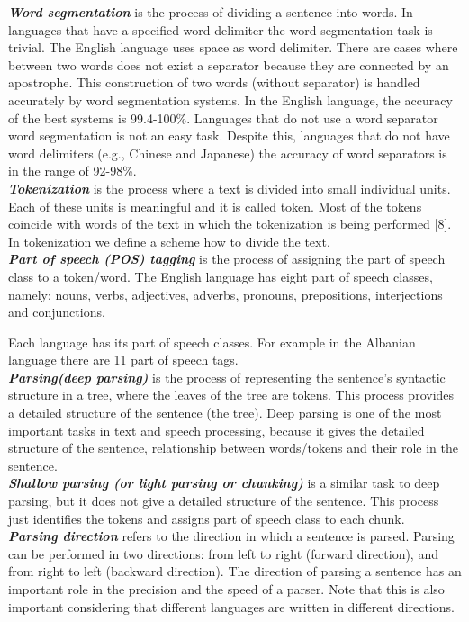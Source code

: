 \emph{ \textbf{ Word segmentation}} is the process of dividing a sentence into words. In languages that have a specified word delimiter the word segmentation task is trivial. The English language uses space as word delimiter. There are cases where between  two words does not exist a separator because they are connected by an apostrophe. This construction of two words (without separator) is handled accurately by word segmentation systems. In the English language, the accuracy of the best systems is 99.4-100\%. Languages that do not use a word separator word segmentation is not an easy task. Despite this, languages that do not have word delimiters (e.g., Chinese and Japanese) the accuracy of word separators is in the range of 92-98\%.\\

\emph{ \textbf{Tokenization}} is the process where a text is divided into small individual units. Each of these units is meaningful and it is called token. Most of the tokens coincide with words of the text in which the tokenization is being performed [8]. In tokenization we define a scheme how to divide the text.\\

\emph{ \textbf{Part of speech (POS) tagging}} is the process of assigning the part of speech class to a token/word. The English language has eight part of speech classes, namely: nouns, verbs, adjectives, adverbs, pronouns, prepositions, interjections and conjunctions.

Each language has its part of speech classes. For example in the Albanian language there are 11 part of speech tags.\\

\emph{ \textbf{Parsing(deep parsing)}} is the process of representing the sentence's syntactic structure in a tree, where the leaves of the tree are tokens. This process provides a detailed structure of the sentence (the tree). Deep parsing is one of the most important tasks in text and speech processing, because it gives the detailed structure of the sentence, relationship between words/tokens and their role in the sentence.\\

\emph{ \textbf{Shallow parsing (or light parsing or chunking)}} is a similar task to deep parsing, but it does not give a detailed structure of the sentence. This process just identifies the tokens and assigns part of speech class to each chunk.\\

\emph{ \textbf{Parsing direction}} refers to the direction in which a sentence is parsed. Parsing can be performed in two directions: from left to right (forward direction), and from right to left (backward direction). The direction of parsing a sentence has an important role in the precision and the speed of a parser. Note that this is also important considering that different languages are written in different directions.\\

